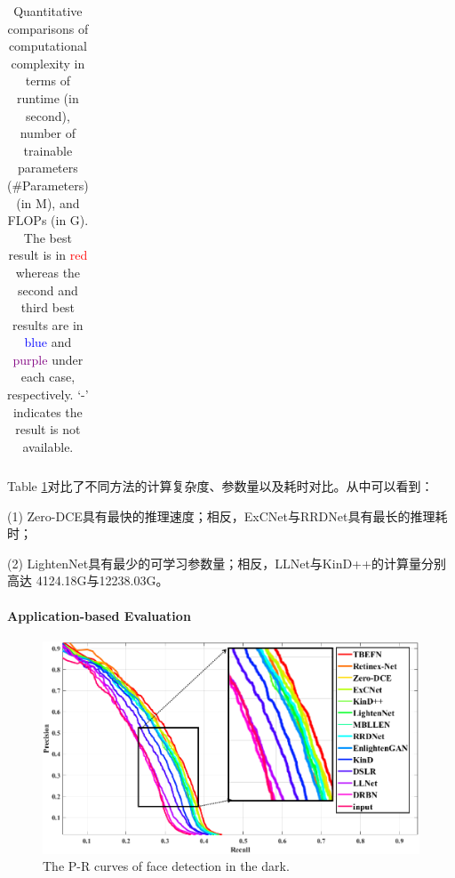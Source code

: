 \documentclass[letterpaper,12pt]{article}
\begin{document}
\begin{table}[!htbp]
\begin{tabular}{>{\centering\arraybackslash}m{1.5cm}|>{\centering\arraybackslash}m{2.5cm}|c|c|c|c}
				
				\hline
				
			\end{tabular}
		\captionsetup{font=scriptsize} %
		\caption{\label{tab: Quantitative comparisons of computational complexity}
			Quantitative comparisons of computational complexity in terms of runtime (in second), number of trainable parameters (\#Parameters) (in M), and FLOPs (in G). The best result is in \textcolor{red}{red} whereas the second and third best results are in \textcolor{blue}{blue} and \textcolor{purple}{purple} under each case, respectively. ‘-’ indicates the result is not available.} %
	\end{table}
	
	Table \ref{tab: Quantitative comparisons of computational complexity}对比了不同方法的计算复杂度、参数量以及耗时对比。从中可以看到：
	
	(1) Zero-DCE具有最快的推理速度；相反，ExCNet与RRDNet具有最长的推理耗时；
	
	(2) LightenNet具有最少的可学习参数量；相反，LLNet与KinD++的计算量分别高达
	4124.18G与12238.03G。
	
	
	\paragraph{Application-based Evaluation} \qquad
	
	\begin{figure}[ht] 
		\centering \includegraphics[width=0.8\columnwidth]{P-R_curves}
		\captionsetup{font=scriptsize}
		\caption{
			\label{fig: P-R_curves} %
			The P-R curves of face detection in the dark.
		}
	\end{figure}
	
\end{document}
